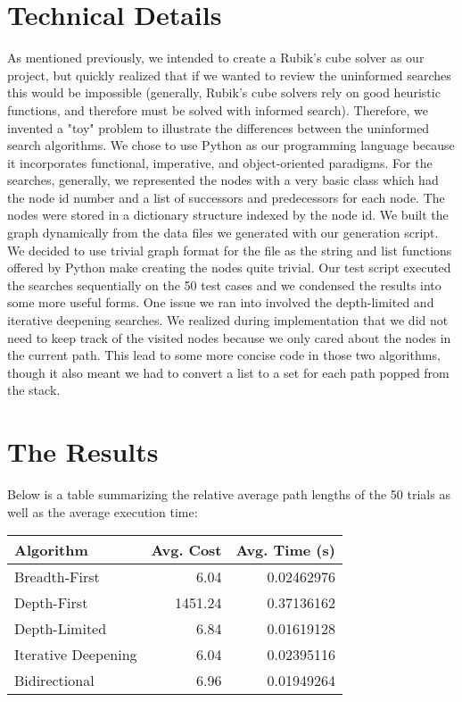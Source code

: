 \documentclass[a4paper,11pt]{report}
\begin{document}
\section{Technical Details}
As mentioned previously, we intended to create a Rubik's cube solver as our
project, but quickly realized that if we wanted to review the uninformed
searches this would be impossible (generally, Rubik's cube solvers rely on good
heuristic functions, and therefore must be solved with informed search).
Therefore, we invented a "toy" problem to illustrate the differences between
the uninformed search algorithms. We chose to use Python as our programming
language because it incorporates functional, imperative, and object-oriented
paradigms.  For the searches, generally, we represented the nodes with a very
basic class which had the node id number and a list of successors and
predecessors for each node.  The nodes were stored in a dictionary structure
indexed by the node id.  We built the graph dynamically from the data files we
generated with our generation script.  We decided to use trivial graph format
for the file as the string and list functions offered by Python make creating
the nodes quite trivial. Our test script executed the searches sequentially
on the 50 test cases and we condensed the results into some more useful forms.
One issue we ran into involved the depth-limited and iterative deepening
searches.  We realized during implementation that we did not need to keep
track of the visited nodes because we only cared about the nodes in the current
path.  This lead to some more concise code in those two algorithms, though
it also meant we had to convert a list to a set for each path popped from
the stack.

\section{The Results}
Below is a table summarizing the relative average path lengths of the 50
trials as well as the average execution time:\vspace{5 mm}

\begin{tabular}{ | l | r | r | }
  \hline
  Algorithm & Avg. Cost & Avg. Time (s) \\ \hline
  Breadth-First & 6.04 & 0.02462976 \\
  Depth-First & 1451.24 & 0.37136162 \\
  Depth-Limited & 6.84 & 0.01619128 \\
  Iterative Deepening & 6.04 & 0.02395116 \\
  Bidirectional & 6.96 & 0.01949264 \\
  \hline
\end{tabular}
\vspace{5 mm}
\end{document}
